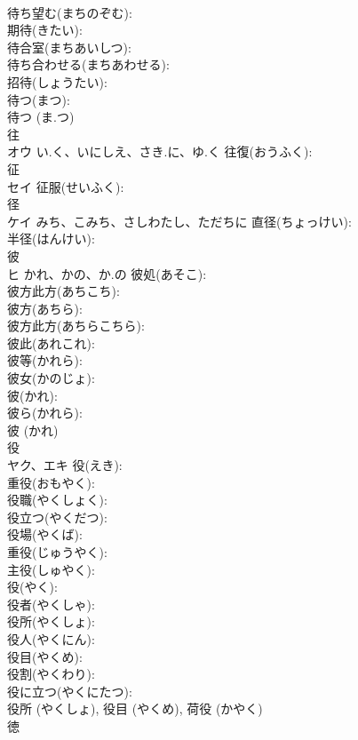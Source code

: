 \documentclass[8pt]{extreport}
\begin{document}
\begin{CJK}{UTF8}{min}
\\	待ち望む(まちのぞむ): 
\\	期待(きたい): 
\\	待合室(まちあいしつ): 
\\	待ち合わせる(まちあわせる): 
\\	招待(しょうたい): 
\\	待つ(まつ): 
\\	待つ (ま.つ)
\\	往			
\\	オウ	い.く、いにしえ、さき.に、ゆ.く	往復(おうふく): 
\\	征			
\\	セイ		征服(せいふく): 
\\	径			
\\	ケイ	みち、こみち、さしわたし、ただちに	直径(ちょっけい): 
\\	半径(はんけい): 
\\	彼			
\\	ヒ	かれ、かの、か.の	彼処(あそこ): 
\\	彼方此方(あちこち): 
\\	彼方(あちら): 
\\	彼方此方(あちらこちら): 
\\	彼此(あれこれ): 
\\	彼等(かれら): 
\\	彼女(かのじょ): 
\\	彼(かれ): 
\\	彼ら(かれら): 
\\	彼 (かれ)
\\	役			
\\	ヤク、エキ		役(えき): 
\\	重役(おもやく): 
\\	役職(やくしょく): 
\\	役立つ(やくだつ): 
\\	役場(やくば): 
\\	重役(じゅうやく): 
\\	主役(しゅやく): 
\\	役(やく): 
\\	役者(やくしゃ): 
\\	役所(やくしょ): 
\\	役人(やくにん): 
\\	役目(やくめ): 
\\	役割(やくわり): 
\\	役に立つ(やくにたつ): 
\\	役所 (やくしょ), 役目 (やくめ), 荷役 (かやく)
\\	徳			

\end{CJK}
\end{document}
